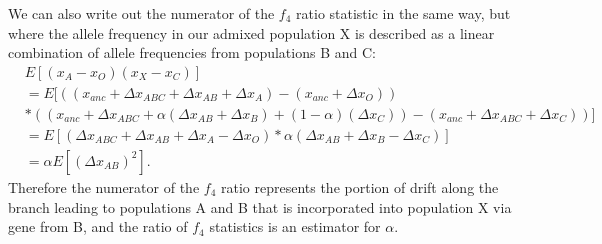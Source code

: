 \documentclass[12pt]{report}
\begin{document}
We can also write out the numerator of the $f_4$ ratio statistic in the same way, but where the allele frequency in our admixed population X is described as a linear combination of allele frequencies from populations B and C:
\begin{align*}
&E[(x_A - x_O)(x_X - x_C)] \\
&= E[((x_{anc} + \Delta{x_{ABC}} + \Delta{x_{AB}} + \Delta{x_{A}}) - (x_{anc} + \Delta{x_{O}})) \\
&*((x_{anc} + \Delta{x_{ABC}} + \alpha(\Delta{x_{AB}} + \Delta{x_B}) + (1 - \alpha)(\Delta{x_C})) - (x_{anc} + \Delta{x_{ABC}} + \Delta{x_C}))] \\
&=E[(\Delta{x_{ABC}} + \Delta{x_{AB}} + \Delta{x_{A}} - \Delta{x_{O}})*\alpha(\Delta{x_{AB}} + \Delta{x_B} - \Delta{x_C})]\\
&=\alpha E[(\Delta{x_{AB}})^2].
\end{align*}
Therefore the numerator of the $f_4$ ratio represents the portion of drift along the branch leading to populations A and B that is incorporated into population X via gene from B, and the ratio of $f_4$ statistics is an estimator for $\alpha$.
\end{document}
